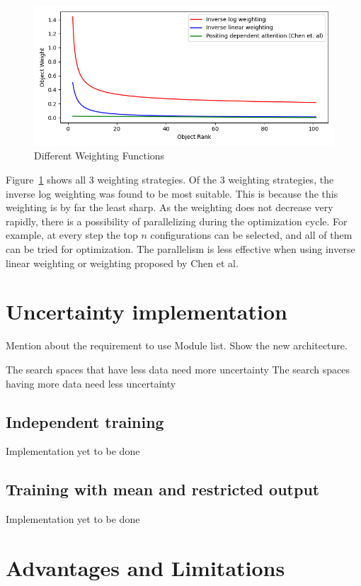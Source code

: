 \documentclass[11pt]{report}
\begin{document}
\begin{figure}[htb]
  \centering
    \includegraphics[scale=0.65]{images/weightingfunctions}
    \caption{Different Weighting Functions}
    \label{fig:weightingfunctions}
\end{figure}

Figure~\ref{fig:weightingfunctions} shows all 3 weighting strategies.
Of the 3 weighting strategies,  the inverse log weighting was found to be most suitable.
This is because the this weighting is by far the least sharp.
As the weighting does not decrease very rapidly,  there is a possibility of parallelizing during the optimization cycle.
For example,  at every step the top $n$ configurations can be selected,  and all of them can be tried for optimization.
The parallelism is less effective when using inverse linear weighting or weighting proposed by Chen et al.

\section{Uncertainty implementation}
Mention about the requirement to use Module list.
Show the new architecture.

The search spaces that have less data need more uncertainty
The search spaces having more data need less uncertainty


\subsection{Independent training}
Implementation yet to be done


\subsection{Training with mean and restricted output}
Implementation yet to be done


\section{Advantages and Limitations}
\end{document}
